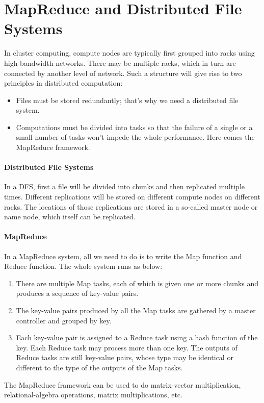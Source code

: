 \documentclass{article}
\begin{document}
\section*{MapReduce and Distributed File Systems}
In cluster computing, compute nodes are typically first grouped into racks using high-bandwidth networks. There may be multiple racks, which in turn are connected by another level of network. Such a structure will give rise to two principles in distributed computation:
\begin{itemize}
\item Files must be stored redundantly; that's why we need a distributed file system.
\item Computations must be divided into tasks so that the failure of a single or a small number of tasks won't impede the whole performance. Here comes the MapReduce framework.
\end{itemize}

\paragraph{Distributed File Systems}
In a DFS, first a file will be divided into chunks and then replicated multiple times. Different replications will be stored on different compute nodes on different racks. The locations of those replications are stored in a so-called master node or name node, which itself can be replicated.

\paragraph{MapReduce}
In a MapReduce system, all we need to do is to write the Map function and Reduce function. The whole system runs as below:
\begin{enumerate}
\item There are multiple Map tasks, each of which is given one or more chunks and produces a sequence of key-value pairs.
\item The key-value pairs produced by all the Map tasks are gathered by a master controller and grouped by key.
\item Each key-value pair is assigned to a Reduce task using a hash function of the key. Each Reduce task may process more than one key. The outputs of Reduce tasks are still key-value pairs, whose type may be identical or different to the type of the outputs of the Map tasks.
\end{enumerate}

The MapReduce framework can be used to do matrix-vector multiplication, relational-algebra operations, matrix multiplications, etc.
\end{document}
